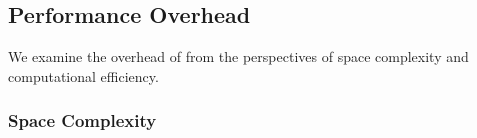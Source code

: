 

\subsection{Performance Overhead}

We examine the overhead of \alias from the perspectives of space complexity and computational efficiency.

\subsubsection{Space Complexity}

